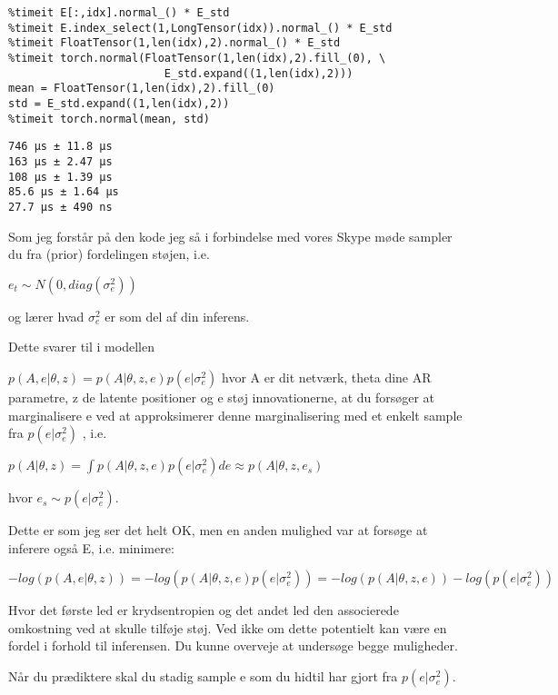         
        \begin{verbatim}
%timeit E[:,idx].normal_() * E_std
%timeit E.index_select(1,LongTensor(idx)).normal_() * E_std
%timeit FloatTensor(1,len(idx),2).normal_() * E_std
%timeit torch.normal(FloatTensor(1,len(idx),2).fill_(0), \
                        E_std.expand((1,len(idx),2)))
mean = FloatTensor(1,len(idx),2).fill_(0)
std = E_std.expand((1,len(idx),2))
%timeit torch.normal(mean, std)
        \end{verbatim}
        \begin{verbatim}
746 µs ± 11.8 µs
163 µs ± 2.47 µs
108 µs ± 1.39 µs
85.6 µs ± 1.64 µs
27.7 µs ± 490 ns
        \end{verbatim}
        
    
Som jeg forstår på den kode jeg så i forbindelse med vores Skype møde sampler du fra  (prior) fordelingen støjen, i.e.


$e_t\sim N(0,diag(\sigma^2_e))$

og lærer hvad $\sigma^2_e$ er som del af din inferens.


Dette svarer til i modellen

$p(A,e|\theta,z)= p(A|\theta,z,e)p(e|\sigma^2_e) $
hvor A er dit netværk, theta dine AR parametre, z de latente positioner og e støj innovationerne, at du forsøger at marginalisere e ved at approksimerer denne marginalisering med et enkelt sample fra $p(e|\sigma^2_e)$ , i.e.


$p(A|\theta,z)=\int p(A|\theta,z,e)p(e|\sigma^2_e)  de \approx p(A|\theta,z,e_s)$

hvor $e_s\sim p(e|\sigma^2_e)$. 



Dette er som jeg ser det helt OK, men en anden mulighed var at forsøge at inferere også E, i.e. minimere:

$-log(p(A,e|\theta,z))=-log( p(A|\theta,z,e)p(e|\sigma^2_e) )=-log( p(A|\theta,z,e))-log(p(e|\sigma^2_e) )$

Hvor det første led er krydsentropien og det andet led den associerede omkostning ved at skulle tilføje støj. Ved ikke om dette potentielt kan være en fordel i forhold til inferensen. Du kunne overveje at undersøge begge muligheder.



Når du prædiktere skal du stadig sample e som du hidtil har gjort fra $p(e|\sigma^2_e)$.